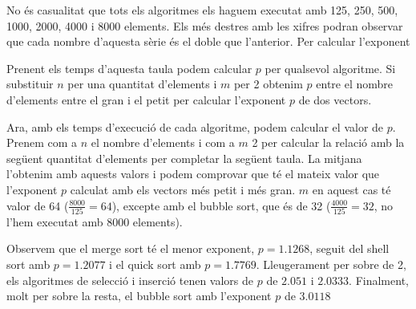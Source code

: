 No és casualitat que tots els algoritmes els haguem executat amb 125, 250, 500, 1000, 2000, 4000 i 8000 elements.
Els més destres amb les xifres podran observar que cada nombre d'aquesta sèrie és el doble que l'anterior.
Per calcular l'exponent

\vspace*{1em}
\noindent
\makebox[\textwidth][c]{
	
}
\vspace*{1em}

Prenent els temps d'aquesta taula podem calcular $p$ per qualsevol algoritme.
Si substituir $n$ per una quantitat d'elements i $m$ per 2 obtenim $p$ entre el nombre d'elements entre el gran i el petit per calcular l'exponent $p$ de dos vectors.


Ara, amb els temps d'execució de cada algoritme, podem calcular el valor de $p$.
Prenem com a $n$ el nombre d'elements i com a $m$ 2 per calcular la relació amb la següent quantitat d'elements per completar la següent taula.
La mitjana l'obtenim amb aquests valors i podem comprovar que té el mateix valor que l'exponent $p$ calculat amb els vectors més petit i més gran. $m$ en aquest cas té valor de 64 ($\frac{8000}{125} = 64$), excepte amb el bubble sort, que és de 32 ($\frac{4000}{125} = 32$, no l'hem executat amb 8000 elements).

\vspace*{1em}
\noindent
\makebox[\textwidth][c]{
	
}
\vspace*{1em}

Observem que el merge sort té el menor exponent, $p=1.1268$, seguit del shell sort amb $p=1.2077$ i el quick sort amb $p=1.7769$.
Lleugerament per sobre de 2, els algoritmes de selecció i inserció tenen valors de $p$ de $2.051$ i $2.0333$.
Finalment, molt per sobre la resta, el bubble sort amb l'exponent $p$ de $3.0118$

\begin{center}
	\resizebox{\textwidth}{!}{}
\end{center}